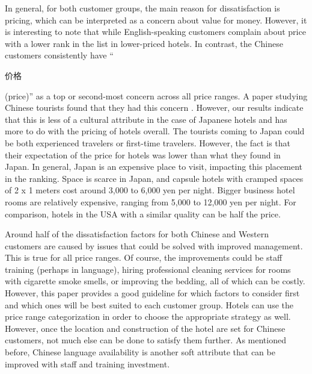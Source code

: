 \documentclass[smallextended,natbib]{svjour3}       %
\begin{document}
    In general, for both customer groups, the main reason for dissatisfaction is pricing, which can be interpreted as a concern about value for money. However, it is interesting to note that while English-speaking customers complain about price with a lower rank in the list in lower-priced hotels. In contrast, the Chinese customers consistently have ``\begin{CJK}{UTF8}{gbsn}价格\end{CJK} (price)'' as a top or second-most concern across all price ranges. A paper studying Chinese tourists found that they had this concern \cite[][]{truong2009}. However, our results indicate that this is less of a cultural attribute in the case of Japanese hotels and has more to do with the pricing of hotels overall. The tourists coming to Japan could be both experienced travelers or first-time travelers. However, the fact is that their expectation of the price for hotels was lower than what they found in Japan. In general, Japan is an expensive place to visit, impacting this placement in the ranking. Space is scarce in Japan, and capsule hotels with cramped spaces of 2 x 1 meters cost around 3,000 to 6,000 yen per night. Bigger business hotel rooms are relatively expensive, ranging from 5,000 to 12,000 yen per night. For comparison, hotels in the USA with a similar quality can be half the price.

    Around half of the dissatisfaction factors for both Chinese and Western customers are caused by issues that could be solved with improved management. This is true for all price ranges. Of course, the improvements could be staff training (perhaps in language), hiring professional cleaning services for rooms with cigarette smoke smells, or improving the bedding, all of which can be costly. However, this paper provides a good guideline for which factors to consider first and which ones will be best suited to each customer group. Hotels can use the price range categorization in order to choose the appropriate strategy as well. However, once the location and construction of the hotel are set for Chinese customers, not much else can be done to satisfy them further. As mentioned before, Chinese language availability is another soft attribute that can be improved with staff and training investment.
\end{document}
